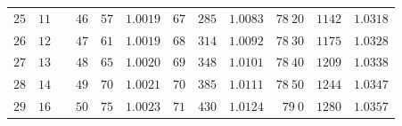 \begin{center}
{\begin{tabular}{r|r|r||r|r|r||r|r|r||r|r|r}
$25$ & $11$ &  & $46$ & $57$ & $1.0019$ & $67$ & $285$ & $1.0083$ & $78\ 20$ & $1142$ & $1.0318$\\
$26$ & $12$ &  & $47$ & $61$ & $1.0019$ & $68$ & $314$ & $1.0092$ & $78\ 30$ & $1175$ & $1.0328$\\
$27$ & $13$ &  & $48$ & $65$ & $1.0020$ & $69$ & $348$ & $1.0101$ & $78\ 40$ & $1209$ & $1.0338$\\
$28$ & $14$ &  & $49$ & $70$ & $1.0021$ & $70$ & $385$ & $1.0111$ & $78\ 50$ & $1244$ & $1.0347$\\
$29$ & $16$ &  & $50$ & $75$ & $1.0023$ & $71$ & $430$ & $1.0124$ & $79\ 0$ & $1280$ & $1.0357$
\end{tabular}}
\end{center}
